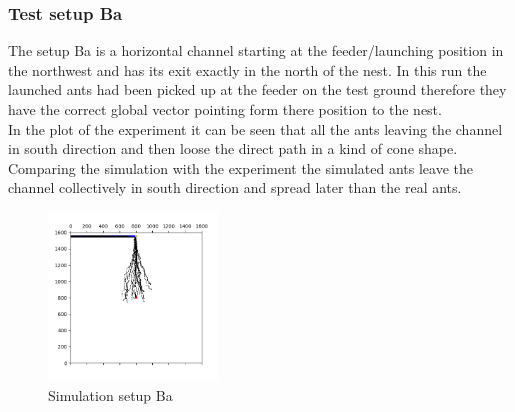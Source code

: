 \documentclass[11pt]{article}
\begin{document}
	\subsubsection{Test setup Ba}
		The setup Ba is a horizontal channel starting at the feeder/launching position in the northwest and has its exit exactly in the north of the nest. In this run the launched ants had been picked up at the feeder on the test ground therefore they have the correct global vector pointing form there position to the nest. \\
In the plot of the experiment it can be seen that all the ants leaving the channel in south direction and then loose the direct path in a kind of cone shape. Comparing the simulation with the experiment the simulated ants leave the channel collectively in south direction and spread later than the real ants.
\begin{figure}
	\includegraphics[width=0.4\textwidth]{test_Ba.png}
	\caption{Simulation setup Ba}
	\label{fig:Ba}
\end{figure}
\end{document}
